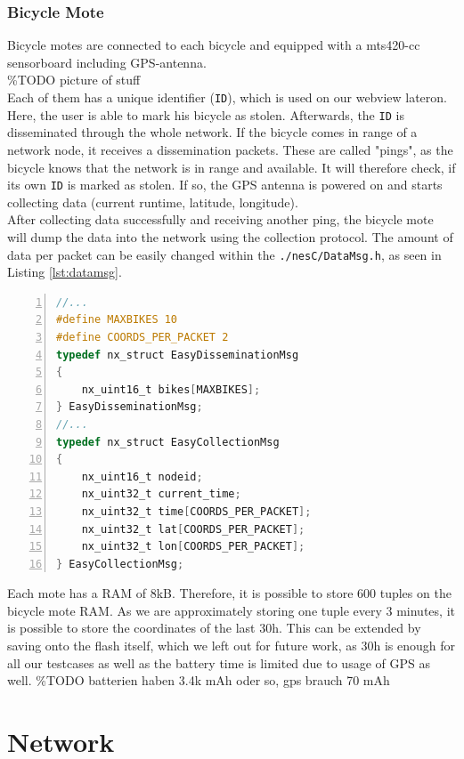 \documentclass[a4paper]{article}
\begin{document}
\subsubsection{Bicycle Mote}
Bicycle motes are connected to each bicycle and equipped with a mts420-cc sensorboard including GPS-antenna.\\
\%TODO picture of stuff\\
Each of them has a unique identifier (\texttt{ID}), which is used on our webview lateron. Here, the user is able to mark his bicycle as stolen. Afterwards, the \texttt{ID} is disseminated through the whole network. If the bicycle comes in range of a network node, it receives a dissemination packets. These are called "pings", as the bicycle knows that the network is in range and available. It will therefore check, if its own \texttt{ID} is marked as stolen. If so, the GPS antenna is powered on and starts collecting data (current runtime, latitude, longitude).\\
After collecting data successfully and receiving another ping, the bicycle mote will dump the data into the network using the collection protocol. The amount of data per packet can be easily changed within the \texttt{./nesC/DataMsg.h}, as seen in Listing \ref{lst:datamsg}.
\begin{lstlisting}[numbers=left, frame=single,language=C, captionpos=b, caption={DataMsg.h, content of packets}, label=lst:datamsg]
//...
#define MAXBIKES 10
#define COORDS_PER_PACKET 2
typedef nx_struct EasyDisseminationMsg 
{
    nx_uint16_t bikes[MAXBIKES];
} EasyDisseminationMsg;
//...
typedef nx_struct EasyCollectionMsg 
{
    nx_uint16_t nodeid;
    nx_uint32_t current_time;
    nx_uint32_t time[COORDS_PER_PACKET];
    nx_uint32_t lat[COORDS_PER_PACKET];
    nx_uint32_t lon[COORDS_PER_PACKET];
} EasyCollectionMsg;
\end{lstlisting}
Each mote has a RAM of 8kB. Therefore, it is possible to store 600 tuples on the bicycle mote RAM. As we are approximately storing one tuple every 3 minutes, it is possible to store the coordinates of the last 30h. This can be extended by saving onto the flash itself, which we left out for future work, as 30h is enough for all our testcases as well as the battery time is limited due to usage of GPS as well. \%TODO batterien haben 3.4k mAh oder so, gps brauch 70 mAh

\section{Network}
\end{document}
